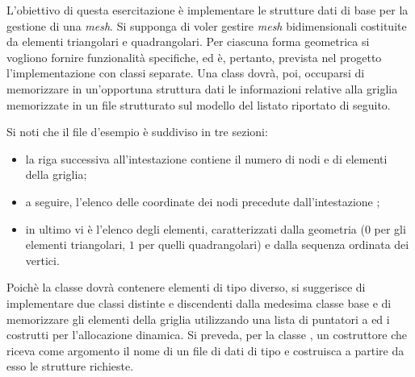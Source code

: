 L'obiettivo di questa esercitazione \`e implementare le strutture dati
di base per la gestione di una \emph{mesh}. Si supponga di voler
gestire \emph{mesh} bidimensionali costituite da elementi triangolari
e quadrangolari. Per ciascuna forma geometrica si vogliono
fornire funzionalit\`a specifiche, ed \`e, pertanto, prevista nel
progetto l'implementazione con classi separate. Una class 
dovr\`a, poi, occuparsi di memorizzare in un'opportuna struttura dati
le informazioni relative alla griglia memorizzate in un file
strutturato sul modello del listato riportato di seguito.
\lstset{basicstyle=\scriptsize\sf}

\lstset{basicstyle=\sf}
Si noti che il file d'esempio \`e suddiviso in tre sezioni:
\begin{itemize}
\item la riga successiva all'intestazione  contiene il numero di
nodi e di elementi della griglia;
\item a seguire, l'elenco delle coordinate dei nodi precedute
  dall'intestazione ;
\item in ultimo vi \`e l'elenco degli elementi, caratterizzati dalla
  geometria ($0$ per gli elementi triangolari, $1$ per quelli
  quadrangolari) e dalla sequenza ordinata dei vertici.
\end{itemize}

Poich\`e la classe  dovr\`a contenere elementi di tipo
diverso, si suggerisce di implementare due classi distinte
 e  discendenti dalla medesima classe
base  e di memorizzare gli elementi della griglia
utilizzando una lista di puntatori a  ed i costrutti per
l'allocazione dinamica. Si preveda, per la classe , un
costruttore che riceva come argomento il nome di un file di dati di
tipo  e costruisca a partire da esso le strutture richieste.

